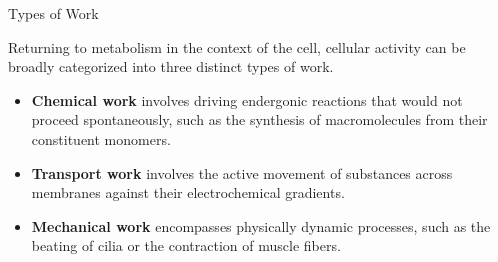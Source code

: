 \documentclass[10pt]{article}
\begin{document}
    \begin{core}{Types of Work}

      Returning to metabolism in the context of the cell, cellular activity can be broadly categorized into three distinct types of work.

      \begin{itemize}

        \item \textbf{Chemical work} involves driving endergonic reactions that would not proceed spontaneously, such as the synthesis of macromolecules from their constituent monomers.

        \item \textbf{Transport work} involves the active movement of substances across membranes against their electrochemical gradients.

        \item \textbf{Mechanical work} encompasses physically dynamic processes, such as the beating of cilia or the contraction of muscle fibers.

      \end{itemize}

    \end{core}
\end{document}
